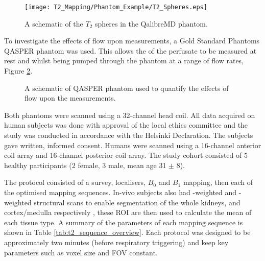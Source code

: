 \begin{figure}[H]
	\centering
	\texttt{[image: T2\_Mapping/Phantom\_Example/T2\_Spheres.eps]}
	\caption{A schematic of the $T_2$ spheres in the QalibreMD phantom.}
	\label{fig:t2_phantom_schematic}	
\end{figure}

To investigate the effects of flow upon \ttwo measurements, a Gold Standard Phantoms \ac{QASPER} phantom was used. This allows the \ttwo of the perfusate to be measured at rest and whilst being pumped through the phantom at a range of flow rates, Figure \ref{fig:t2_flow_phantom_schematic}. 

\begin{figure}[H]
	\centering
	\caption{A schematic of \ac{QASPER} phantom used to quantify the effects of flow upon the \ttwo measurements.}
	\label{fig:t2_flow_phantom_schematic}	
\end{figure}

Both phantoms were scanned using a 32-channel head coil. All data acquired on human subjects was done with approval of the local ethics committee and the study was conducted in accordance with the Helsinki Declaration. The subjects gave written, informed consent. Humans were scanned using a 16-channel anterior coil array and 16-channel posterior coil array. The study cohort consisted of 5 healthy participants (2 female, 3 male, mean age 31 $\pm$ 8).

The protocol consisted of a survey, localisers, $B_0$ and $B_1$ mapping, then each of the optimised \ttwo mapping sequences. In-vivo subjects also had \ttwo-weighted and \tone-weighted structural scans to enable segmentation of the whole kidneys, and cortex/medulla respectively \cite{petzold_building_2014, will_automated_2014}, these \ac{ROI} are then used to calculate the mean \ttwo of each tissue type. A summary of the parameters of each \ttwo mapping sequence is shown in Table \ref{tab:t2_sequence_overview}. Each protocol was designed to be approximately two minutes (before respiratory triggering) and keep key parameters such as voxel size and \ac{FOV} constant.

